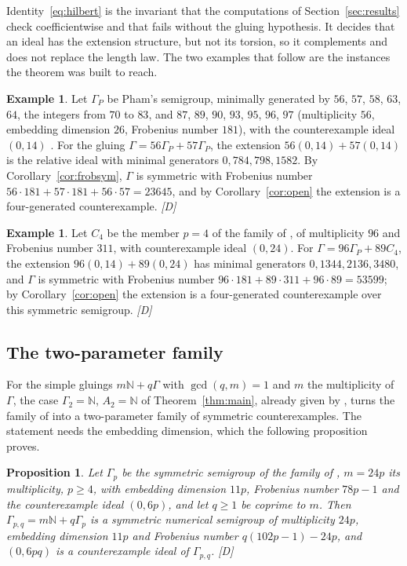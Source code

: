 \documentclass[11pt]{article}
\newtheorem{proposition}[theorem]{Proposition}
\theoremstyle{definition}
\newtheorem{example}[theorem]{Example}
\theoremstyle{remark}
\newcommand{\N}{\mathbb{N}}
\newcommand{\mD}{\emph{[D]}}
\begin{document}
Identity~\eqref{eq:hilbert} is the invariant that the computations of Section~\ref{sec:results} check coefficientwise and that
fails without the gluing hypothesis. It decides that an ideal has the extension structure, but not its torsion, so it complements and does not replace the length law.
The two examples that follow are the instances the theorem was built to reach.

\begin{example}\label{ex:pham}
Let $\Gamma_P$ be Pham's semigroup, minimally generated by $56$, $57$, $58$, $63$, $64$, the integers from $70$ to $83$, and
$87$, $89$, $90$, $93$, $95$, $96$, $97$ (multiplicity $56$, embedding dimension $26$, Frobenius number $181$), with the counterexample
ideal $(0,14)$ \cite{Pham2026}. For the gluing $\Gamma=56\Gamma_P+57\Gamma_P$, the extension $56(0,14)+57(0,14)$ is the relative ideal
with minimal generators $0,784,798,1582$. By Corollary~\ref{cor:frobsym}, $\Gamma$ is symmetric with Frobenius number
$56\cdot181+57\cdot181+56\cdot57=23645$, and by Corollary~\ref{cor:open} the extension is a four-generated counterexample. \mD{}
\end{example}

\begin{example}\label{ex:mixed}
Let $C_4$ be the member $p=4$ of the family of \cite{SantibanezLeal2026}, of multiplicity $96$ and
Frobenius number $311$, with counterexample ideal $(0,24)$. For $\Gamma=96\Gamma_P+89C_4$, the extension
$96(0,14)+89(0,24)$ has minimal generators $0,1344,2136,3480$, and $\Gamma$ is symmetric with Frobenius
number $96\cdot181+89\cdot311+96\cdot89=53599$; by Corollary~\ref{cor:open} the extension is a four-generated counterexample over this symmetric semigroup. \mD{}
\end{example}

\subsection{The two-parameter family}

For the simple gluings $m\N+q\Gamma$ with $\gcd(q,m)=1$ and $m$ the multiplicity of $\Gamma$, the case $\Gamma_2=\N$, $A_2=\N$ of
Theorem~\ref{thm:main}, already given by \cite[Proposition~10]{GarciaSanchezLeamer2013}, turns the family of
\cite{SantibanezLeal2026} into a two-parameter family of symmetric counterexamples. The statement needs the embedding
dimension, which the following proposition proves.

\begin{proposition}\label{prop:embdim}
Let $\Gamma_p$ be the symmetric semigroup of the family of \cite{SantibanezLeal2026}, $m=24p$ its multiplicity, $p\ge4$, with embedding
dimension $11p$, Frobenius number $78p-1$ and the counterexample ideal $(0,6p)$, and let $q\ge1$ be coprime to $m$. Then $\Gamma_{p,q}=m\N+q\Gamma_p$ is a
symmetric numerical semigroup of multiplicity $24p$, embedding dimension $11p$ and Frobenius number $q(102p-1)-24p$, and
$(0,6pq)$ is a counterexample ideal of $\Gamma_{p,q}$. \mD{}
\end{proposition}
\end{document}
